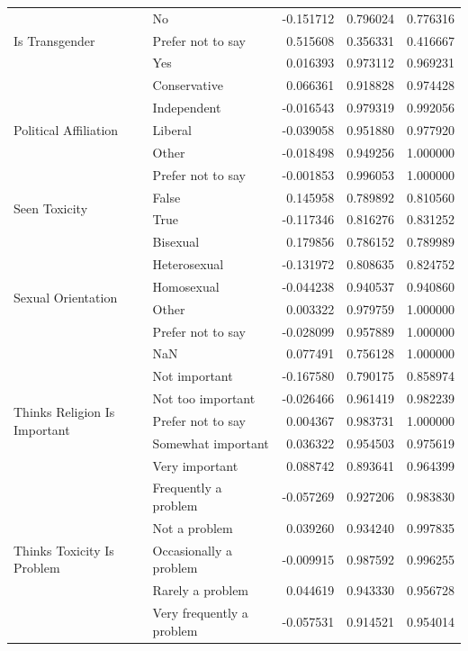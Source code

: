 \begin{table}
\begin{tabular*}{\textwidth}{llrrr}
\multirow[t]{3}{*}{Is Transgender} & No & -0.151712 & 0.796024 & 0.776316 \\
 & Prefer not to say & 0.515608 & 0.356331 & 0.416667 \\
 & Yes & 0.016393 & 0.973112 & 0.969231 \\
\cline{1-5}
\multirow[t]{5}{*}{Political Affiliation} & Conservative & 0.066361 & 0.918828 & 0.974428 \\
 & Independent & -0.016543 & 0.979319 & 0.992056 \\
 & Liberal & -0.039058 & 0.951880 & 0.977920 \\
 & Other & -0.018498 & 0.949256 & 1.000000 \\
 & Prefer not to say & -0.001853 & 0.996053 & 1.000000 \\
\cline{1-5}
\multirow[t]{2}{*}{Seen Toxicity} & False & 0.145958 & 0.789892 & 0.810560 \\
 & True & -0.117346 & 0.816276 & 0.831252 \\
\cline{1-5}
\multirow[t]{6}{*}{Sexual Orientation} & Bisexual & 0.179856 & 0.786152 & 0.789989 \\
 & Heterosexual & -0.131972 & 0.808635 & 0.824752 \\
 & Homosexual & -0.044238 & 0.940537 & 0.940860 \\
 & Other & 0.003322 & 0.979759 & 1.000000 \\
 & Prefer not to say & -0.028099 & 0.957889 & 1.000000 \\
 & NaN & 0.077491 & 0.756128 & 1.000000 \\
\cline{1-5}
\multirow[t]{5}{*}{Thinks Religion Is Important} & Not important & -0.167580 & 0.790175 & 0.858974 \\
 & Not too important & -0.026466 & 0.961419 & 0.982239 \\
 & Prefer not to say & 0.004367 & 0.983731 & 1.000000 \\
 & Somewhat important & 0.036322 & 0.954503 & 0.975619 \\
 & Very important & 0.088742 & 0.893641 & 0.964399 \\
\cline{1-5}
\multirow[t]{5}{*}{Thinks Toxicity Is Problem} & Frequently a problem & -0.057269 & 0.927206 & 0.983830 \\
 & Not a problem & 0.039260 & 0.934240 & 0.997835 \\
 & Occasionally a problem & -0.009915 & 0.987592 & 0.996255 \\
 & Rarely a problem & 0.044619 & 0.943330 & 0.956728 \\
 & Very frequently a problem & -0.057531 & 0.914521 & 0.954014 \\
\cline{1-5}
\bottomrule
\end{tabular*}
\end{table}
